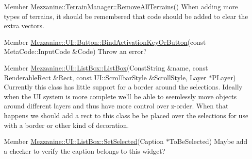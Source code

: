 \label{todo__todo000026}
\hypertarget{todo__todo000026}{}
 
\begin{DoxyDescription}
\item[Member \hyperlink{classMezzanine_1_1TerrainManager_ae940f33a369e54c2322de4202d236eb2}{Mezzanine::TerrainManager::RemoveAllTerrains}() ]When adding more types of terrains, it should be remembered that code should be added to clear the extra vectors. 
\end{DoxyDescription}

\label{todo__todo000027}
\hypertarget{todo__todo000027}{}
 
\begin{DoxyDescription}
\item[Member \hyperlink{classMezzanine_1_1UI_1_1Button_aae0a7f6a07f79856ed6da8b8b3bc5ecd}{Mezzanine::UI::Button::BindActivationKeyOrButton}(const MetaCode::InputCode \&Code) ]Throw an error? 
\end{DoxyDescription}

\label{todo__todo000028}
\hypertarget{todo__todo000028}{}
 
\begin{DoxyDescription}
\item[Member \hyperlink{classMezzanine_1_1UI_1_1ListBox_a60130f372bc78fbb20f28270bbed8cf2}{Mezzanine::UI::ListBox::ListBox}(ConstString \&name, const RenderableRect \&Rect, const UI::ScrollbarStyle \&ScrollStyle, Layer $\ast$PLayer) ]Currently this class has little support for a border around the selections. Ideally when the UI system is more complete we'll be able to seemlessly move objects around different layers and thus have more control over z-\/order. When that happens we should add a rect to this class be be placed over the selections for use with a border or other kind of decoration. 
\end{DoxyDescription}

\label{todo__todo000029}
\hypertarget{todo__todo000029}{}
 
\begin{DoxyDescription}
\item[Member \hyperlink{classMezzanine_1_1UI_1_1ListBox_a81ddebed01b1503478c2fa7b75ce4b24}{Mezzanine::UI::ListBox::SetSelected}(Caption $\ast$ToBeSelected) ]Maybe add a checker to verify the caption belongs to this widget? 
\end{DoxyDescription}

\label{todo__todo000030}
\hypertarget{todo__todo000030}{}
 
